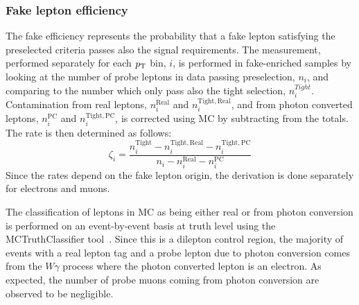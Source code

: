 \clearpage

\subsubsection{Fake lepton efficiency}

The fake efficiency represents the probability that a fake lepton satisfying the preselected criteria passes also the signal requirements. 
The measurement, performed separately for each $p_{\mathrm{T}}$ bin, $i$, is performed in fake-enriched samples by looking at the number of probe leptons in data 
passing preselection, $n_i$, and comparing to the number which only pass also the tight
selection, $n^{Tight}_i$. Contamination from real leptons, $n^{\mathrm{Real}}_i$ and $n^{\mathrm{Tight}, \mathrm{Real}}_i$, 
and from photon converted leptons, $n^{\mathrm{PC}}_i$ and $n^{\mathrm{Tight},\mathrm{PC}}_i$, 
is corrected using MC by subtracting from the totals.  The rate is then determined as follows:
\begin{equation}
\zeta_i=\frac{n^{\mathrm{Tight}}_i-n^{\mathrm{Tight},\mathrm{Real}}_i-n^{\mathrm{Tight},\mathrm{PC}}_i} {n_i -n^{\mathrm{Real}}_i -n^{\mathrm{PC}}_i }
\label{eq:fakerate}
\end{equation}
Since the rates depend on the fake lepton origin, the derivation is done separately for electrons and muons.     

The classification of leptons in MC as being either real or from photon conversion is performed on an event-by-event basis at truth level using the MCTruthClassifier tool~\cite{MCtruthclassifier:twiki}.  
Since this is a dilepton control region, the majority of events with a real lepton
tag and a probe lepton due to photon conversion comes from the $W\gamma$ process where the photon converted lepton is an electron.
As expected, the number of probe muons coming from photon conversion are observed to be negligible.

